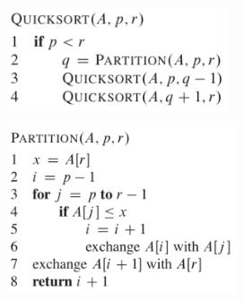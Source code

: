 \documentclass[12pt]{report}
\begin{document}
\vspace{\baselineskip}
\begin{multicols}{2}



\begin{figure}[H]
	\begin{Center}
		\includegraphics[width=2.55in,height=1.2in]{./media/image25.png}
	\end{Center}
\end{figure}



\par




\begin{figure}[H]
	\begin{Center}
		\includegraphics[width=2.67in,height=1.94in]{./media/image26.png}
	\end{Center}
\end{figure}




\end{multicols}
\par


\vspace{\baselineskip}

\vspace{\baselineskip}
\end{document}
